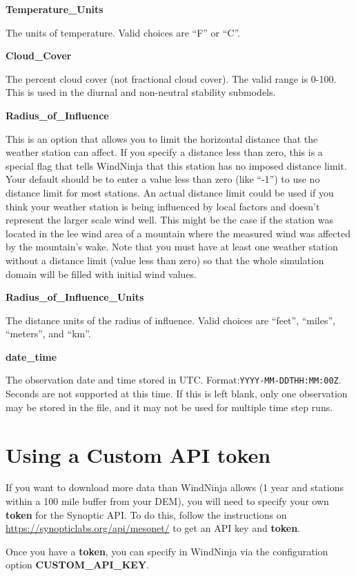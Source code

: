 \documentclass[12pt]{article}
\begin{document}
\textbf{Temperature\_Units}

The units of temperature.  
Valid choices are “F” or “C”.

\textbf{Cloud\_Cover}

The percent cloud cover (not fractional cloud cover).  
The valid range is 0-100.  
This is used in the diurnal and non-neutral stability submodels.

\textbf{Radius\_of\_Influence}

This is an option that allows you to limit the horizontal distance that the weather station can affect.  
If you specify a distance less than zero, this is a special flag that tells WindNinja that this station has no imposed distance limit.  
Your default should be to enter a value less than zero (like “-1”) to use no distance limit for most stations.  
An actual distance limit could be used if you think your weather station is being influenced by local factors and doesn't represent the larger scale wind well.  
This might be the case if the station was located in the lee wind area of a mountain where the measured wind was affected by the mountain's wake.  
Note that you must have at least one weather station without a distance limit (value less than zero) so that the whole simulation domain will be filled with initial wind values.

\textbf{Radius\_of\_Influence\_Units}

The distance units of the radius of influence.  
Valid choices are “feet”, “miles”, “meters”, and “km”.

\textbf{date\_time}

The observation date and time stored in UTC. 
Format:\texttt{YYYY-MM-DDTHH:MM:00Z}. 
Seconds are not supported at this time. 
If this is left blank, only one observation may be stored in the file, and it may not be used for multiple time step runs.

\section{Using a Custom API token}

If you want to download more data than WindNinja allows (1 year and stations within a 100 mile buffer from your DEM), you will need to specify your own \textbf{token} for the Synoptic API. 
To do this, follow the instructions on \url{https://synopticlabs.org/api/mesonet/} to get an API key and \textbf{token}.

Once you have a \textbf{token}, you can specify in WindNinja via the configuration option \textbf{CUSTOM\_API\_KEY}.
\end{document}
